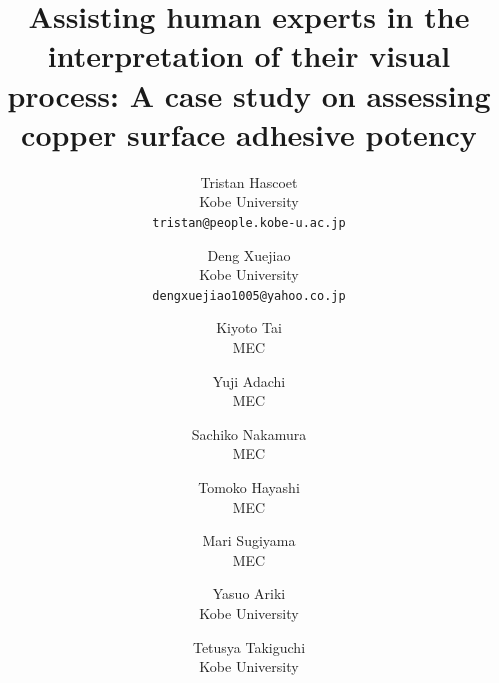 \documentclass[10pt,twocolumn,letterpaper]{article}
\begin{document}
\title{Assisting human experts in the interpretation of their visual process: A case study on assessing copper surface adhesive potency}%

\author{
Tristan Hascoet\\
Kobe University\\
{\tt\small tristan@people.kobe-u.ac.jp}
\and
Deng Xuejiao\\
Kobe University\\
{\tt\small dengxuejiao1005@yahoo.co.jp}
\and
Kiyoto Tai\\
MEC\\
\and
Yuji Adachi \\
MEC \\
\and
Sachiko Nakamura\\
MEC\\
\and
Tomoko Hayashi\\
MEC\\
\and
Mari Sugiyama\\
MEC\\
\and
Yasuo Ariki\\
Kobe University\\
\and
Tetusya Takiguchi\\
Kobe University\\
}

\maketitle
\end{document}
